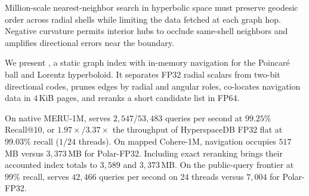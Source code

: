 Million-scale nearest-neighbor search in hyperbolic space must preserve geodesic order across radial shells while limiting the data fetched at each graph hop. Negative curvature permits interior hubs to occlude same-shell neighbors and amplifies directional errors near the boundary.

We present \textbf{\rquiver{}}, a static graph index with in-memory navigation for the Poincar\'e ball and Lorentz hyperboloid. It separates FP32 radial scalars from two-bit directional codes, prunes edges by radial and angular roles, co-locates navigation data in $4$\,KiB pages, and reranks a short candidate list in FP64.

On native {MERU-1M}, \rquiver{} serves $2{,}547$/$53{,}483$ queries per second at $99.25\%$ Recall@10, or $1.97\times$/$3.37\times$ the throughput of {HyperspaceDB} FP32 flat at $99.03\%$ recall ($1$/$24$ threads). On mapped {Cohere-1M}, navigation occupies $517$\,MB versus $3{,}373$\,MB for {Polar-FP32}. Including exact reranking brings their accounted index totals to $3{,}589$ and $3{,}373$\,MB. On the public-query frontier at $99\%$ recall, \rquiver{} serves $42{,}466$ queries per second on 24 threads versus $7{,}004$ for {Polar-FP32}.
